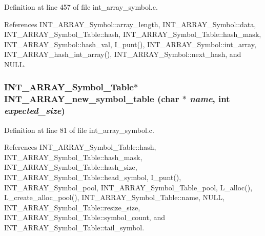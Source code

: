 Definition at line 457 of file int\_\-array\_\-symbol.c.

References INT\_\-ARRAY\_\-Symbol::array\_\-length, INT\_\-ARRAY\_\-Symbol::data, INT\_\-ARRAY\_\-Symbol\_\-Table::hash, INT\_\-ARRAY\_\-Symbol\_\-Table::hash\_\-mask, INT\_\-ARRAY\_\-Symbol::hash\_\-val, I\_\-punt(), INT\_\-ARRAY\_\-Symbol::int\_\-array, INT\_\-ARRAY\_\-hash\_\-int\_\-array(), INT\_\-ARRAY\_\-Symbol::next\_\-hash, and NULL.
\subsubsection{\setlength{\rightskip}{0pt plus 5cm}\bf{INT\_\-ARRAY\_\-Symbol\_\-Table}$\ast$ INT\_\-ARRAY\_\-new\_\-symbol\_\-table (char $\ast$ {\em name}, int {\em expected\_\-size})}\label{int__array__symbol_8h_2b063d070049ca7e1b3ac6be348c853e}




Definition at line 81 of file int\_\-array\_\-symbol.c.

References INT\_\-ARRAY\_\-Symbol\_\-Table::hash, INT\_\-ARRAY\_\-Symbol\_\-Table::hash\_\-mask, INT\_\-ARRAY\_\-Symbol\_\-Table::hash\_\-size, INT\_\-ARRAY\_\-Symbol\_\-Table::head\_\-symbol, I\_\-punt(), INT\_\-ARRAY\_\-Symbol\_\-pool, INT\_\-ARRAY\_\-Symbol\_\-Table\_\-pool, L\_\-alloc(), L\_\-create\_\-alloc\_\-pool(), INT\_\-ARRAY\_\-Symbol\_\-Table::name, NULL, INT\_\-ARRAY\_\-Symbol\_\-Table::resize\_\-size, INT\_\-ARRAY\_\-Symbol\_\-Table::symbol\_\-count, and INT\_\-ARRAY\_\-Symbol\_\-Table::tail\_\-symbol.
